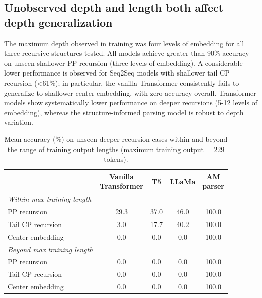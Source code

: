 \subsection{Unobserved depth and length both affect depth generalization} \label{subsec:depth_gen}

The maximum depth observed in training was four levels of embedding for all three recursive structures tested. All models achieve greater than 90\% accuracy on unseen shallower PP recursion (three levels of embedding). A considerable lower performance is observed for Seq2Seq models with shallower tail CP recursion (<61\%); in particular, the vanilla Transformer consistently fails to generalize to shallower center embedding, with zero accuracy overall. Transformer models show systematically lower performance on deeper recursions (5-12 levels of embedding), whereas the structure-informed parsing model is robust to depth variation. 

\begin{table}[ht]
    \centering
    \begin{tabular}{lcccc}
    \toprule
     & \makecell[c]{Vanilla \\ Transformer} & T5 & LLaMa & \makecell[c]{AM \\parser} \\
    \midrule
     \textit{Within max training length}  &&&\\
    PP recursion & 29.3 &37.0 &46.0& 100.0 \\
    Tail CP recursion & 3.0 & 17.7&40.2& 100.0\\
    Center embedding & 0.0 & 0.0 &0.0& 100.0\\
    \midrule
    \textit{Beyond max training length }  &&&\\
    PP recursion & 0.0 &0.0 &0.0&100.0 \\
    Tail CP recursion & 0.0 & 0.0&0.0&100.0\\
    Center embedding & 0.0 &0.0&0.0&100.0 \\
    \bottomrule
    \end{tabular}
    \caption{Mean accuracy (\%) on unseen deeper recursion cases within and beyond the range of training output lengths (maximum training output = 229 tokens).}
    \label{tab:res_recursion}
\end{table}

